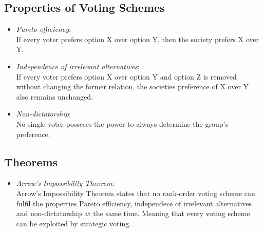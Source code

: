 \documentclass[conference]{IEEEtran}
\begin{document}
\subsection{Properties of Voting Schemes}
\begin{itemize}
    \item \textit{Pareto efficiency}:\\
    If every voter prefers option X over option Y, then the society prefers X over Y.
    \item \textit{Independence of irrelevant alternatives}:\\
    If every voter prefers option X over option Y and option Z is removed without changing the former relation, the societies preference of X over Y also remains unchanged.
    \item \textit{Non-dictatorship}:\\
    No single voter posseses the power to always determine the group's preference.
\end{itemize}

\subsection{Theorems}
\begin{itemize}
    \item \textit{Arrow's Impossibility Theorem}\cite{arrow2012social}:\\
    Arrow's Impossibility Theorem states that no rank-order voting scheme can fulfil the properties Pareto efficiency, independece of irrelevant alternatives and non-dictatorship at the same time.
    Meaning that every voting scheme can be exploited by strategic voting.\cite{pitt2006voting}
\end{itemize}


\end{document}
